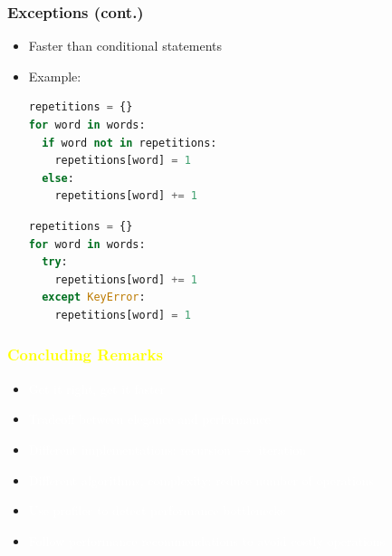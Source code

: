 \documentclass[xcolor=table,10pt,final]{beamer}
\begin{document}
\begin{frame}[fragile]
	\frametitle{Exceptions (cont.)}
	\begin{itemize}
		\item Faster than conditional statements
		\item Example:
			\begin{lstlisting}[language=Python]
repetitions = {}
for word in words:
  if word not in repetitions:
    repetitions[word] = 1
  else:
    repetitions[word] += 1
			\end{lstlisting}
			\begin{lstlisting}[language=Python]
repetitions = {}
for word in words:
  try:
    repetitions[word] += 1
  except KeyError:
    repetitions[word] = 1
			\end{lstlisting}
	\end{itemize}
\end{frame}


{
\begin{frame}
	\frametitle{\textcolor{yellow}{Concluding Remarks}}
	\begin{itemize}
		\item \textcolor{white}{Get it right, get it faster}
		\item \textcolor{white}{Tradeoff between elegance and performance}
		\item \textcolor{white}{Different implementations: recursion $\rightarrow$ iteration}
		\item \textcolor{white}{Different algorithms, complexity: reduce number of operations}
		\item \textcolor{white}{Use profiler to detect performance bottlenecks}
		\item \textcolor{white}{Follow performance recommendations to avoid costly operations}
	\end{itemize}
\end{frame}
}

\end{document}

